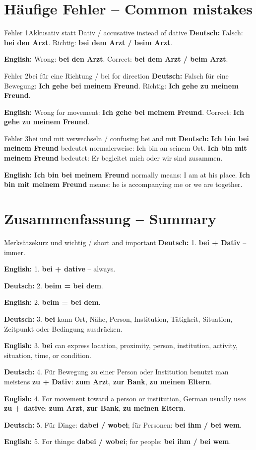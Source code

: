 \documentclass[a4paper,11pt]{article}
\newcommand{\GermanText}[1]{\textbf{Deutsch: }#1\par}
\newcommand{\EnglishText}[1]{{\small\color{SoftGray}\textbf{English: }#1\par}}
\begin{document}
\section{Häufige Fehler -- Common mistakes}
\begin{grammarentry}{Fehler 1}{Akkusativ statt Dativ / accusative instead of dative}
\GermanText{Falsch: \textbf{bei den Arzt}. Richtig: \textbf{bei dem Arzt / beim Arzt}.}
\EnglishText{Wrong: \textbf{bei den Arzt}. Correct: \textbf{bei dem Arzt / beim Arzt}.}
\end{grammarentry}
\begin{grammarentry}{Fehler 2}{bei für eine Richtung / bei for direction}
\GermanText{Falsch für eine Bewegung: \textbf{Ich gehe bei meinem Freund}. Richtig: \textbf{Ich gehe zu meinem Freund}.}
\EnglishText{Wrong for movement: \textbf{Ich gehe bei meinem Freund}. Correct: \textbf{Ich gehe zu meinem Freund}.}
\end{grammarentry}
\begin{grammarentry}{Fehler 3}{bei und mit verwechseln / confusing bei and mit}
\GermanText{\textbf{Ich bin bei meinem Freund} bedeutet normalerweise: Ich bin an seinem Ort. \textbf{Ich bin mit meinem Freund} bedeutet: Er begleitet mich oder wir sind zusammen.}
\EnglishText{\textbf{Ich bin bei meinem Freund} normally means: I am at his place. \textbf{Ich bin mit meinem Freund} means: he is accompanying me or we are together.}
\end{grammarentry}

\section{Zusammenfassung -- Summary}
\begin{grammarentry}{Merksätze}{kurz und wichtig / short and important}
\GermanText{1. \textbf{bei + Dativ} -- immer.}
\EnglishText{1. \textbf{bei + dative} -- always.}
\GermanText{2. \textbf{beim = bei dem}.}
\EnglishText{2. \textbf{beim = bei dem}.}
\GermanText{3. \textbf{bei} kann Ort, Nähe, Person, Institution, Tätigkeit, Situation, Zeitpunkt oder Bedingung ausdrücken.}
\EnglishText{3. \textbf{bei} can express location, proximity, person, institution, activity, situation, time, or condition.}
\GermanText{4. Für Bewegung zu einer Person oder Institution benutzt man meistens \textbf{zu + Dativ}: \textbf{zum Arzt}, \textbf{zur Bank}, \textbf{zu meinen Eltern}.}
\EnglishText{4. For movement toward a person or institution, German usually uses \textbf{zu + dative}: \textbf{zum Arzt}, \textbf{zur Bank}, \textbf{zu meinen Eltern}.}
\GermanText{5. Für Dinge: \textbf{dabei / wobei}; für Personen: \textbf{bei ihm / bei wem}.}
\EnglishText{5. For things: \textbf{dabei / wobei}; for people: \textbf{bei ihm / bei wem}.}
\end{grammarentry}
\end{document}
